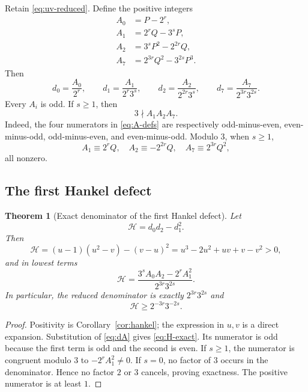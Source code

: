 \documentclass[11pt,oneside]{article}
\newtheorem{theorem}{Theorem}[section]
\theoremstyle{definition}
\theoremstyle{remark}
\begin{document}
Retain \eqref{eq:uv-reduced}.  Define the positive integers
\begin{equation}\label{eq:A-defs}
 \begin{aligned}
 A_0&=P-2^r,\\
 A_1&=2^rQ-3^sP,\\
 A_2&=3^sP^2-2^{2r}Q,\\
 A_7&=2^{3r}Q^2-3^{2s}P^3.
 \end{aligned}
\end{equation}
Then
\begin{equation}\label{eq:dA}
 d_0=\frac{A_0}{2^r},\qquad
 d_1=\frac{A_1}{2^r3^s},\qquad
 d_2=\frac{A_2}{2^{2r}3^s},\qquad
 d_7=\frac{A_7}{2^{3r}3^{2s}}.
\end{equation}
Every $A_i$ is odd.  If $s\ge1$, then
\begin{equation}\label{eq:A-mod3}
 3\nmid A_1A_2A_7.
\end{equation}
Indeed, the four numerators in \eqref{eq:A-defs} are respectively odd-minus-even,
even-minus-odd, odd-minus-even, and even-minus-odd.  Modulo $3$, when $s\ge1$,
\[
 A_1\equiv2^rQ,
 \quad A_2\equiv-2^{2r}Q,
 \quad A_7\equiv2^{3r}Q^2,
\]
all nonzero.

\subsection{The first Hankel defect}

\begin{theorem}[Exact denominator of the first Hankel defect]\label{thm:H-denom}
Let
\begin{equation}\label{eq:H-def}
 \mathcal H=d_0d_2-d_1^2.
\end{equation}
Then
\begin{equation}\label{eq:H-uv}
 \mathcal H
 =(u-1)(u^2-v)-(v-u)^2
 =u^3-2u^2+uv+v-v^2>0,
\end{equation}
and in lowest terms
\begin{equation}\label{eq:H-exact}
 \mathcal H
 =\frac{3^sA_0A_2-2^rA_1^2}{2^{3r}3^{2s}}.
\end{equation}
In particular, the reduced denominator is exactly $2^{3r}3^{2s}$ and
\begin{equation}\label{eq:H-lower}
 \mathcal H\ge2^{-3r}3^{-2s}.
\end{equation}
\end{theorem}

\begin{proof}
Positivity is Corollary~\ref{cor:hankel}; the expression in $u,v$ is a direct expansion.
Substitution of \eqref{eq:dA} gives \eqref{eq:H-exact}.  Its numerator is odd because the
first term is odd and the second is even.  If $s\ge1$, the numerator is congruent modulo $3$
to $-2^rA_1^2\ne0$.  If $s=0$, no factor of $3$ occurs in the denominator.  Hence no factor
$2$ or $3$ cancels, proving exactness.  The positive numerator is at least $1$.
\end{proof}
\end{document}
